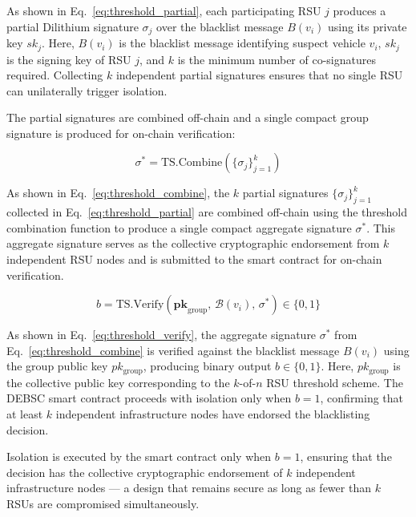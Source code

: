\documentclass[12pt, a4paper]{report}
\begin{document}
As shown in Eq.~\eqref{eq:threshold_partial}, each participating RSU $j$ produces a partial Dilithium signature $\sigma_j$ over the blacklist message $B(v_i)$ using its private key $sk_j$. Here, $B(v_i)$ is the blacklist message identifying suspect vehicle $v_i$, $sk_j$ is the signing key of RSU $j$, and $k$ is the minimum number of co-signatures required. Collecting $k$ independent partial signatures ensures that no single RSU can unilaterally trigger isolation.

The partial signatures are combined off-chain and a single compact group
signature is produced for on-chain verification:

\begin{equation}
\label{eq:threshold_combine}
\sigma^* = \mathrm{TS.Combine}\!\left(\{\sigma_j\}_{j=1}^{k}\right)
\end{equation}

As shown in Eq.~\eqref{eq:threshold_combine}, the $k$ partial signatures $\{\sigma_j\}_{j=1}^{k}$ collected in Eq.~\eqref{eq:threshold_partial} are combined off-chain using the threshold combination function to produce a single compact aggregate signature $\sigma^*$. This aggregate signature serves as the collective cryptographic endorsement from $k$ independent RSU nodes and is submitted to the smart contract for on-chain verification.

\begin{equation}
\label{eq:threshold_verify}
b = \mathrm{TS.Verify}\!\left(\mathbf{pk}_{\mathrm{group}},\,
\mathcal{B}(v_i),\, \sigma^*\right) \in \{0,1\}
\end{equation}

As shown in Eq.~\eqref{eq:threshold_verify}, the aggregate signature $\sigma^*$ from Eq.~\eqref{eq:threshold_combine} is verified against the blacklist message $B(v_i)$ using the group public key $pk_{\text{group}}$, producing binary output $b \in \{0, 1\}$. Here, $pk_{\text{group}}$ is the collective public key corresponding to the $k$-of-$n$ RSU threshold scheme. The DEBSC smart contract proceeds with isolation only when $b = 1$, confirming that at least $k$ independent infrastructure nodes have endorsed the blacklisting decision.

\noindent Isolation is executed by the smart contract only when $b = 1$,
ensuring that the decision has the collective cryptographic endorsement of
$k$ independent infrastructure nodes — a design that remains secure as long
as fewer than $k$ RSUs are compromised simultaneously.

\end{document}
